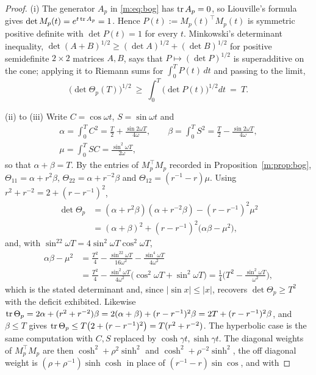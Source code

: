 \begin{proof}
(i) The generator $A_p$ in \eqref{m:eq:bog} has $\mathrm{tr}\,A_p=0$, so Liouville's formula gives $\det M_p(t)=e^{t\,\mathrm{tr}\,A_p}=1$. Hence $P(t):=M_p(t)^\top M_p(t)$ is symmetric positive definite with $\det P(t)=1$ for every $t$. Minkowski's determinant inequality, $\det(A+B)^{1/2}\ge(\det A)^{1/2}+(\det B)^{1/2}$ for positive semidefinite $2\times2$ matrices $A,B$, says that $P\mapsto(\det P)^{1/2}$ is superadditive on the cone; applying it to Riemann sums for $\int_0^TP(t)\,dt$ and passing to the limit,
\[
\big(\det\Theta_p(T)\big)^{1/2}\ \ge\ \int_0^T\big(\det P(t)\big)^{1/2}dt\ =\ T .
\]

(ii) to (iii) Write $C=\cos\omega t$, $S=\sin\omega t$ and
\[
\begin{gathered}
\alpha=\int_0^TC^2=\frac T2+\frac{\sin2\omega T}{4\omega},\qquad
\beta=\int_0^TS^2=\frac T2-\frac{\sin2\omega T}{4\omega},\\
\mu=\int_0^TSC=\frac{\sin^2\omega T}{2\omega},
\end{gathered}
\]
so that $\alpha+\beta=T$. By the entries of $M_p^\top M_p$ recorded in Proposition~\ref{m:prop:bog}, $\Theta_{11}=\alpha+r^2\beta$, $\Theta_{22}=\alpha+r^{-2}\beta$ and $\Theta_{12}=(r^{-1}-r)\mu$. Using $r^2+r^{-2}=2+(r-r^{-1})^2$,
\[
\begin{aligned}
\det\Theta_p&=(\alpha+r^2\beta)(\alpha+r^{-2}\beta)-(r-r^{-1})^2\mu^2\\
&=(\alpha+\beta)^2+(r-r^{-1})^2\big(\alpha\beta-\mu^2\big),
\end{aligned}
\]
and, with $\sin^22\omega T=4\sin^2\omega T\cos^2\omega T$,
\[
\begin{aligned}
\alpha\beta-\mu^2&=\frac{T^2}4-\frac{\sin^22\omega T}{16\omega^2}-\frac{\sin^4\omega T}{4\omega^2}\\
&=\frac{T^2}4-\frac{\sin^2\omega T}{4\omega^2}\big(\cos^2\omega T+\sin^2\omega T\big)
=\frac14\Big(T^2-\frac{\sin^2\omega T}{\omega^2}\Big),
\end{aligned}
\]
which is the stated determinant and, since $|\sin x|\le|x|$, recovers $\det\Theta_p\ge T^2$ with the deficit exhibited. Likewise $\mathrm{tr}\,\Theta_p=2\alpha+(r^2+r^{-2})\beta=2(\alpha+\beta)+(r-r^{-1})^2\beta=2T+(r-r^{-1})^2\beta$, and $\beta\le T$ gives $\mathrm{tr}\,\Theta_p\le T\big(2+(r-r^{-1})^2\big)=T(r^2+r^{-2})$. The hyperbolic case is the same computation with $C,S$ replaced by $\cosh\gamma t,\sinh\gamma t$. The diagonal weights of $M_p^\top M_p$ are then $\cosh^2+\rho^2\sinh^2$ and $\cosh^2+\rho^{-2}\sinh^2$, the off diagonal weight is $(\rho+\rho^{-1})\sinh\cosh$ in place of $(r^{-1}-r)\sin\cos$, and with

\end{proof}
